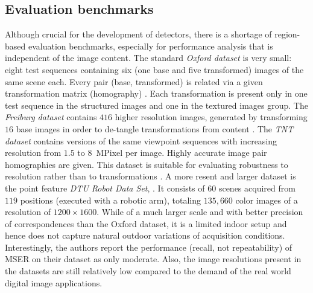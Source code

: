 \documentclass[conference,compsoc]{IEEEtran}
\begin{document}
\subsection{Evaluation benchmarks}
Although crucial for the development of detectors, there is a shortage of region-based evaluation benchmarks, especially for performance analysis that is independent of the image content.  The standard {\em Oxford dataset} is very small: eight test sequences containing six (one base and five transformed) images of the same scene each. Every pair (base, transformed) is related via a given transformation matrix (homography) \cite{Mikolajczyk:2005}.  Each transformation is present only in one test sequence in the structured images and one in the textured images group. The {\em Freiburg dataset} contains $416$ higher resolution images, generated by transforming $16$ base images in order to de-tangle transformations from content \cite{FischerDB14}.  
The {\em TNT dataset} contains versions of the same viewpoint sequences with increasing resolution from $1.5$ to $8$~MPixel per image. Highly accurate image pair homographies are given. This dataset is suitable for evaluating robustness to resolution rather than to transformations \cite{CorRos2013}.  A more resent and larger dataset is the point feature {\em DTU Robot Data Set}, \cite{AanaesDP12}. It  consists of $60$ scenes acquired from $119$ positions (executed with a robotic arm), totaling $135, 660$ color images of a resolution of $1200 \times 1600$. While of a much larger scale and with better precision of correspondences than the Oxford dataset, it is a limited indoor setup and hence does not capture natural outdoor variations of acquisition conditions. Interestingly, the authors report the performance (recall, not repeatability) of MSER on their dataset as only moderate. Also, the image resolutions present in the datasets are still relatively low compared to the demand of the real world digital image applications. 
\end{document}
